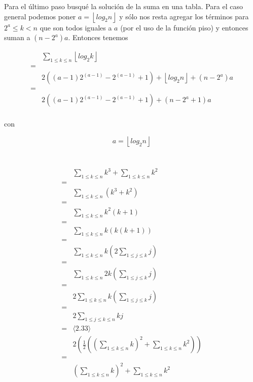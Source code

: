 \documentclass{article}
\newcommand{\piso}[1]{\left \lfloor #1 \right \rfloor}
\begin{document}
Para el último paso busqué la solución de la suma en una tabla.
Para el caso general podemos poner $a = \piso{log_2n}$ y sólo nos resta agregar
los términos para $2^a \leq k < n$ que son todos iguales a $a$ (por el uso de la
función piso) y entonces suman a $(n-2^a)a$. Entonces tenemos

\begin{align*}
 & \sum_{1 \leq k \leq n} \piso{log_2k} \\
 = & \\
 & 2((a-1)2^{(a-1)} - 2^{(a-1)} +1) + \piso{log_2n} + (n-2^a)a \\
 = & \\
 & 2((a-1)2^{(a-1)} - 2^{(a-1)} +1) + (n-2^a+1)a \\
\end{align*}

con

$$
a = \piso{log_2n}
$$

\newpage

\section{}

\begin{align*}
 & \sum_{1 \leq k \leq n} k^3 + \sum_{1 \leq k \leq n} k^2 \\
 = & \\
 & \sum_{1 \leq k \leq n}(k^3+k^2) \\
 = & \\
 & \sum_{1 \leq k \leq n}k^2(k+1) \\
 = & \\
 & \sum_{1 \leq k \leq n}k(k(k+1)) \\
 = & \\
 & \sum_{1 \leq k \leq n}k\left(2 \sum_{1 \leq j \leq k} j\right) \\
 = & \\
 & \sum_{1 \leq k \leq n}2k\left(\sum_{1 \leq j \leq k} j\right) \\
 = & \\
 & 2\sum_{1 \leq k \leq n}k\left(\sum_{1 \leq j \leq k} j\right) \\
 = & \\
 & 2\sum_{1 \leq j \leq k \leq n}kj \\
 = & \langle \text{2.33} \rangle \\
 & 2\left(\frac{1}{2}\left(\left(\sum_{1 \leq k \leq n} k \right)^2 + \sum_{1 \leq k \leq n}k^2 \right)\right) \\
 = & \\
 & \left(\sum_{1 \leq k \leq n} k \right)^2 + \sum_{1 \leq k \leq n}k^2 \\
\end{align*}
\end{document}
